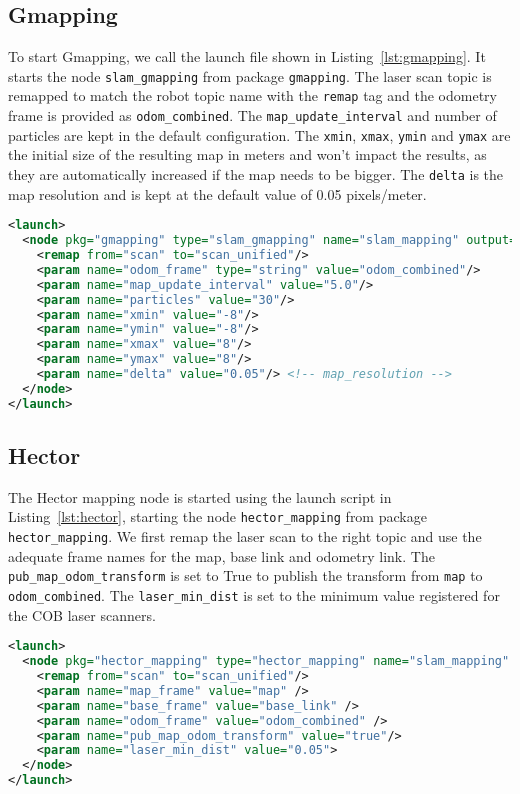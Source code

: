 \subsection{Gmapping}

To start Gmapping, we call the launch file shown in Listing~\ref{lst:gmapping}. It starts the node \texttt{slam\_gmapping} from package \texttt{gmapping}. The laser scan topic is remapped to match the robot topic name with the \texttt{remap} tag and the odometry frame is provided as \texttt{odom\_combined}. The \texttt{map\_update\_interval} and number of particles are kept in the default configuration. The \texttt{xmin}, \texttt{xmax}, \texttt{ymin} and \texttt{ymax} are the initial size of the resulting map in meters and won't impact the results, as they are automatically increased if the map needs to be bigger. The \texttt{delta} is the map resolution and is kept at the default value of 0.05 pixels/meter.

\begin{lstlisting}[caption={Gmapping launch file.},label={lst:gmapping},language=XML]
<launch>
  <node pkg="gmapping" type="slam_gmapping" name="slam_mapping" output="screen">
    <remap from="scan" to="scan_unified"/>
    <param name="odom_frame" type="string" value="odom_combined"/>
    <param name="map_update_interval" value="5.0"/>
    <param name="particles" value="30"/>
    <param name="xmin" value="-8"/>
    <param name="ymin" value="-8"/>
    <param name="xmax" value="8"/>
    <param name="ymax" value="8"/>
    <param name="delta" value="0.05"/> <!-- map_resolution -->
  </node>
</launch>
\end{lstlisting}

\subsection{Hector}

The Hector mapping node is started using the launch script in Listing~\ref{lst:hector}, starting the node \texttt{hector\_mapping} from package \texttt{hector\_mapping}. We first remap the laser scan to the right topic and use the adequate frame names for the map, base link and odometry link. The \texttt{pub\_map\_odom\_transform} is set to True to publish the transform from \texttt{map} to \texttt{odom\_combined}. The \texttt{laser\_min\_dist} is set to the minimum value registered for the COB laser scanners.

\begin{lstlisting}[caption={Hector launch file.},label={lst:hector},language=XML]
<launch>
  <node pkg="hector_mapping" type="hector_mapping" name="slam_mapping"    output="screen">
    <remap from="scan" to="scan_unified"/>
    <param name="map_frame" value="map" />
    <param name="base_frame" value="base_link" />
    <param name="odom_frame" value="odom_combined" />
    <param name="pub_map_odom_transform" value="true"/>
    <param name="laser_min_dist" value="0.05">
  </node>
</launch>
\end{lstlisting}

